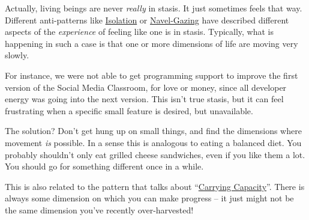 Actually, living beings are never \emph{really} in stasis. It just
sometimes feels that way. Different anti-patterns like
\href{http://socialmediaclassroom.com/host/peeragogy/forum/anti-patterns-concerns-complaints-and-critiques\#comment-2267}{Isolation}
or
\href{http://socialmediaclassroom.com/host/peeragogy/forum/anti-patterns-concerns-complaints-and-critiques\#comment-1808}{Navel-Gazing}
have described different aspects of the \emph{experience} of feeling
like one is in stasis. Typically, what is happening in such a case is
that one or more dimensions of life are moving very slowly.

For instance, we were not able to get programming support to improve the
first version of the Social Media Classroom, for love or money, since
all developer energy was going into the next version. This isn't true
stasis, but it can feel frustrating when a specific small feature is
desired, but unavailable.

The solution? Don't get hung up on small things, and find the dimensions
where movement \emph{is} possible. In a sense this is analogous to
eating a balanced diet. You probably shouldn't only eat grilled cheese
sandwiches, even if you like them a lot. You should go for something
different once in a while.

This is also related to the pattern that talks about
``\href{http://socialmediaclassroom.com/host/peeragogy/forum/patterns-and-use-cases\#comment-2320}{Carrying
Capacity}''. There is always some dimension on which you can make
progress -- it just might not be the same dimension you've recently
over-harvested!
